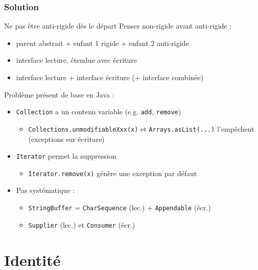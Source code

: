 \documentclass[draft]{beamer}
\begin{document}
\begin{frame}
\frametitle{Solution}
\begin{exampleblock}{Ne pas être anti-rigide dès le départ}
 Penser non-rigide avant anti-rigide :
 \begin{itemize}
  \item parent abstrait + enfant 1 rigide + enfant 2 anti-rigide
  \item interface lecture, étendue avec écriture
  \item interface lecture + interface écriture (+ interface combinée)
 \end{itemize}
\end{exampleblock}
Problème présent de base en Java :
\begin{itemize}
 \item \lstinline{Collection} a un contenu variable (e.g. \lstinline{add}, \lstinline{remove})
 \begin{itemize}
  \item \lstinline{Collections.unmodifiableXxx(x)} et \lstinline{Arrays.asList(...)} l'empêchent (exceptions sur écriture)
 \end{itemize}
 \item \lstinline{Iterator} permet la suppression
 \begin{itemize}
  \item \lstinline{Iterator.remove(x)} génère une exception par défaut
 \end{itemize}
 \item Pas systématique :
 \begin{itemize}
  \item \lstinline{StringBuffer} = \lstinline{CharSequence} (lec.) + \lstinline{Appendable} (écr.)
  \item \lstinline{Supplier} (lec.) et \lstinline{Consumer} (écr.)
 \end{itemize}
\end{itemize}
\end{frame}

\section{Identité}
\subsection{}
\end{document}
